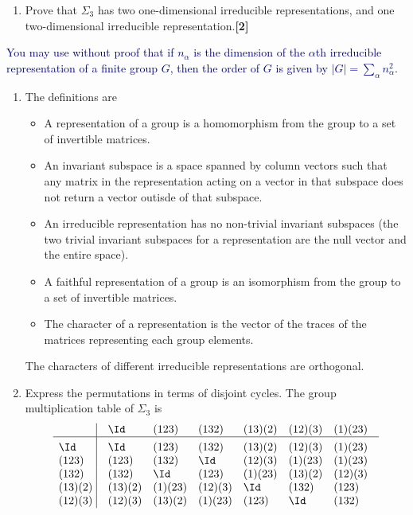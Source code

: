 \documentclass[a4paper]{article}
\begin{document}
\begin{qns}
\begin{enumerate}[label=(\roman*)]
\item Prove that $\Sigma_3$ has two one-dimensional irreducible representations, and one two-dimensional irreducible representation.\hfill\textbf{[2]}
\end{enumerate}
\begin{mdframed}
\textcolor{darkblue}{You may use without proof that if $n_\alpha$ is the dimension of the $\alpha$th irreducible representation of a finite group $G$, then the order of $G$ is given by $|G|=\sum_\alpha n_\alpha^2$.}
\end{mdframed}
\end{qns}
\begin{ans}\leavevmode
\begin{enumerate}[label=(\roman*)]
\item The definitions are
\begin{itemize}
    \item A representation of a group is a homomorphism from the group to a set of invertible matrices.
    \item An invariant subspace is a space spanned by column vectors such that any matrix in the representation acting on a vector in that subspace does not return a vector outisde of that subspace.
    \item An irreducible representation has no non-trivial invariant subspaces (the two trivial invariant subspaces for a representation are the null vector and the entire space).
    \item A faithful representation of a group is an isomorphism from the  group to a set of invertible matrices.
    \item The character of a representation is the vector of the traces of the matrices representing each group elements.
\end{itemize}
The characters of different irreducible representations are orthogonal.
\item Express the permutations in terms of disjoint cycles. The group multiplication table of $\Sigma_3$ is
$$\vbox{\tabskip0.5em\offinterlineskip
    \halign{\strut$#$\hfil\ \tabskip1em\vrule&&$#$\hfil\cr
        & \Id   & (123) & (132) & (13)(2) & (12)(3) &(1)(23)     \cr
    \noalign{\hrule}\vrule height 12pt width 0pt
    \Id & \Id  & (123) & (132) & (13)(2) & (12)(3) &(1)(23)     \cr
    (123) & (123) & (132) & \Id &(12)(3)& (1)(23) & (1)(23) \cr
    (132) & (132) & \Id & (123) & (1)(23) & (13)(2) & (12)(3) \cr
    (13)(2) & (13)(2) & (1)(23) &(12)(3) & \Id &(132) & (123) \cr
    (12)(3) & (12)(3)& (13)(2)&(1)(23) &(123) &\Id & (132) \cr
}}$$
\end{enumerate}
\end{ans}
\end{document}
